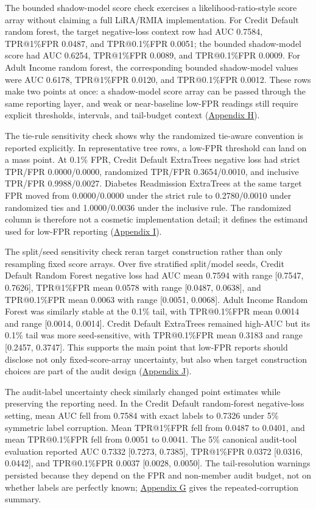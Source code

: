 \documentclass[
  10pt,
  twocolumn]{article}
\begin{document}
The bounded shadow-model score check exercises a likelihood-ratio-style score array without claiming a full LiRA/RMIA implementation. For Credit Default random forest, the target negative-loss context row had AUC 0.7584, TPR@1\%FPR 0.0487, and TPR@0.1\%FPR 0.0051; the bounded shadow-model score had AUC 0.6254, TPR@1\%FPR 0.0089, and TPR@0.1\%FPR 0.0009. For Adult Income random forest, the corresponding bounded shadow-model values were AUC 0.6178, TPR@1\%FPR 0.0120, and TPR@0.1\%FPR 0.0012. These rows make two points at once: a shadow-model score array can be passed through the same reporting layer, and weak or near-baseline low-FPR readings still require explicit thresholds, intervals, and tail-budget context (\protect\hyperlink{appendix-h-bounded-shadow-model-score-check}{Appendix H}).

The tie-rule sensitivity check shows why the randomized tie-aware convention is reported explicitly. In representative tree rows, a low-FPR threshold can land on a mass point. At 0.1\% FPR, Credit Default ExtraTrees negative loss had strict TPR/FPR 0.0000/0.0000, randomized TPR/FPR 0.3654/0.0010, and inclusive TPR/FPR 0.9988/0.0027. Diabetes Readmission ExtraTrees at the same target FPR moved from 0.0000/0.0000 under the strict rule to 0.2780/0.0010 under randomized ties and 1.0000/0.0036 under the inclusive rule. The randomized column is therefore not a cosmetic implementation detail; it defines the estimand used for low-FPR reporting (\protect\hyperlink{appendix-i-tie-rule-sensitivity}{Appendix I}).

The split/seed sensitivity check reran target construction rather than only resampling fixed score arrays. Over five stratified split/model seeds, Credit Default Random Forest negative loss had AUC mean 0.7594 with range {[}0.7547, 0.7626{]}, TPR@1\%FPR mean 0.0578 with range {[}0.0487, 0.0638{]}, and TPR@0.1\%FPR mean 0.0063 with range {[}0.0051, 0.0068{]}. Adult Income Random Forest was similarly stable at the 0.1\% tail, with TPR@0.1\%FPR mean 0.0014 and range {[}0.0014, 0.0014{]}. Credit Default ExtraTrees remained high-AUC but its 0.1\% tail was more seed-sensitive, with TPR@0.1\%FPR mean 0.3183 and range {[}0.2457, 0.3747{]}. This supports the main point that low-FPR reports should disclose not only fixed-score-array uncertainty, but also when target construction choices are part of the audit design (\protect\hyperlink{appendix-j-splitseed-sensitivity}{Appendix J}).

The audit-label uncertainty check similarly changed point estimates while preserving the reporting need. In the Credit Default random-forest negative-loss setting, mean AUC fell from 0.7584 with exact labels to 0.7326 under 5\% symmetric label corruption. Mean TPR@1\%FPR fell from 0.0487 to 0.0401, and mean TPR@0.1\%FPR fell from 0.0051 to 0.0041. The 5\% canonical audit-tool evaluation reported AUC 0.7332 {[}0.7273, 0.7385{]}, TPR@1\%FPR 0.0372 {[}0.0316, 0.0442{]}, and TPR@0.1\%FPR 0.0037 {[}0.0028, 0.0050{]}. The tail-resolution warnings persisted because they depend on the FPR and non-member audit budget, not on whether labels are perfectly known; \protect\hyperlink{appendix-g-label-uncertainty-check}{Appendix G} gives the repeated-corruption summary.
\end{document}
